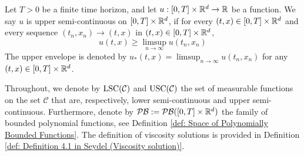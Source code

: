 \begin{definition}
\label{def: upper semi-continuous functions}
    Let $T>0$ be a finite time horizon, and let $u: [0,T] \times \mathbb{R}^d \rightarrow \mathbb{R}$ be a function. We say $u$ is upper semi-continuous on $[0,T] \times \mathbb{R}^d$, if for every $(t,x) \in [0,T] \times \mathbb{R}^d$ and every sequence $(t_n,x_n) \rightarrow (t,x)$ in $(t,x) \in [0,T] \times \mathbb{R}^d$, 
    \begin{equation*}
        u(t,x) \geq \limsup_{n \rightarrow \infty} u(t_n,x_n)
    \end{equation*}
    The upper envelope is denoted by $u_*(t,x) = \limsup_{n \rightarrow \infty} u(t_n,x_n)$ for any $(t,x) \in [0,T] \times \mathbb{R}^d$.
\end{definition}

Throughout, we denote by $\operatorname{LSC}(\mathcal{C})$ and $\operatorname{USC}(\mathcal{C})$ the set of measurable functions on the set $\mathcal{C}$ that are, respectively, lower semi-continuous and upper semi-continuous. Furthermore, denote by $\mathcal{PB} := \mathcal{PB}([0,T]\times \mathbb{R}^d)$ the family of bounded polynomial functions, see Definition \ref{def: Space of Polynomially Bounded Functions}. The definition of viscosity solutions is provided in Definition \ref{def: Definition 4.1 in Seydel (Viscosity solution)}. 

